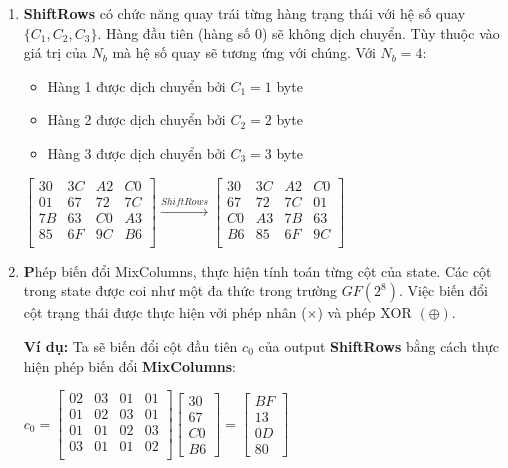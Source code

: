 \begin{enumerate}[label= \textbf{Bước \arabic*:}]
	\item \textbf{ShiftRows} có chức năng quay trái từng hàng trạng thái với hệ số quay $\{C_1, C_2, C_3\}$. Hàng đầu tiên (hàng số 0) sẽ không dịch chuyển. Tùy thuộc vào giá trị của $N_b$ mà hệ số quay sẽ tương ứng với chúng. Với $N_b = 4$: 
	\begin{itemize}
		\item Hàng 1 được dịch chuyển bởi $C_1 = 1$ byte
		\item Hàng 2 được dịch chuyển bởi $C_2 = 2$ byte
		\item Hàng 3 được dịch chuyển bởi $C_3 = 3$ byte
	\end{itemize}
	\begin{center}
		$
		\begin{bmatrix}
			30 & 3C & A2 & C0\\
			01 & 67 & 72 & 7C\\
			7B & 63 & C0 & A3\\
			85 & 6F & 9C & B6 \\
		\end{bmatrix}
		\xrightarrow{ShiftRows}
		\begin{bmatrix}
			30 & 3C & A2 & C0\\
			67 & 72 & 7C & 01\\
			C0 & A3 & 7B & 63\\
			B6 & 85 & 6F & 9C\\
		\end{bmatrix}
		$
		
	\end{center}
	
	\item \textbf Phép biến đổi {MixColumns}, thực hiện tính toán từng cột của state. Các cột trong state được coi như một đa thức trong trường $GF(2^8)$. Việc biến đổi cột trạng thái được thực hiện vởi phép nhân ($\times$) và phép $\text{XOR }(\oplus)$.
	
	\textbf{Ví dụ:} Ta sẽ biến đổi cột đầu tiên $c_0$ của output \textbf{ShiftRows} bằng cách thực hiện phép biến đổi \textbf{MixColumns}:
	\begin{center}
		$c_0
		=
		\begin{bmatrix}
			02 & 03 & 01 & 01 \\
			01 & 02 & 03 & 01 \\
			01 & 01 & 02 & 03\\
			03 & 01 & 01 & 02 \\
		\end{bmatrix} \begin{bmatrix} 30 \\ 67 \\ C0 \\B6 \end{bmatrix}
		=  \begin{bmatrix} BF \\ 13 \\ 0D \\ 80 \end{bmatrix}$
	\end{center}
	

\end{enumerate}
